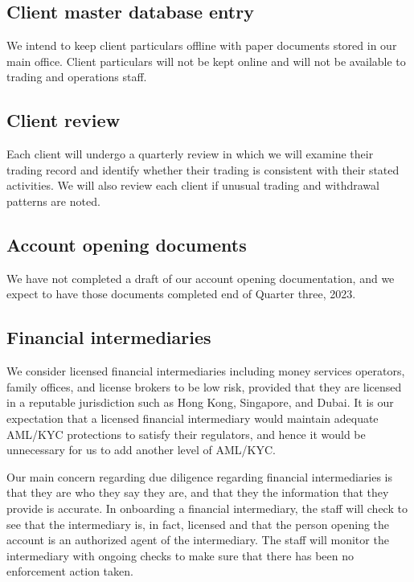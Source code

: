 \subsection{Client master database entry}
We intend to keep client particulars offline with paper documents
stored in our main office.  Client particulars will not be kept online
and will not be available to trading and operations staff.

\subsection{Client review}
Each client will undergo a quarterly review in which we will examine
their trading record and identify whether their trading is
consistent with their stated activities.  We will also review each
client if unusual trading and withdrawal patterns are noted.

\subsection{Account opening documents}
We have not completed a draft of our account opening documentation, and
we expect to have those documents completed end of Quarter three, 2023.

\subsection{Financial intermediaries}
We consider licensed financial intermediaries including money services
operators, family offices, and license brokers to be low risk,
provided that they are licensed in a reputable jurisdiction such as
Hong Kong, Singapore, and Dubai.  It is our expectation that a
licensed financial intermediary would maintain adequate AML/KYC
protections to satisfy their regulators, and hence it would be
unnecessary for us to add another level of AML/KYC.

Our main concern regarding due diligence regarding financial
intermediaries is that they are who they say they are, and that they
the information that they provide is accurate.  In onboarding a
financial intermediary, the staff will check to see that the
intermediary is, in fact, licensed and that the person opening the
account is an authorized agent of the intermediary.  The staff will
monitor the intermediary with ongoing checks to make sure that there
has been no enforcement action taken.

